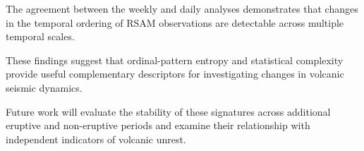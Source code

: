 \documentclass[journal]{IEEEtran}
\begin{document}
	The agreement between the weekly and daily analyses demonstrates
	that changes in the temporal ordering of RSAM observations are
	detectable across multiple temporal scales.
	
	These findings suggest that ordinal-pattern entropy and
	statistical complexity provide useful complementary descriptors
	for investigating changes in volcanic seismic dynamics.
	
	Future work will evaluate the stability of these signatures
	across additional eruptive and non-eruptive periods and examine
	their relationship with independent indicators of volcanic
	unrest.
	
	
	
	
	
	
\end{document}
